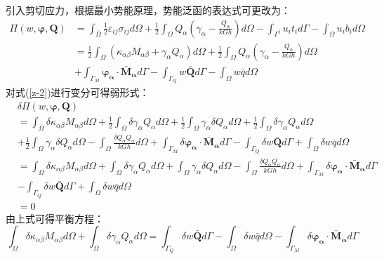 引入剪切应力，根据最小势能原理，势能泛函的表达式可更改为：
\begin{equation}\label{z-2}
\begin{split} 
    \Pi(w,\boldsymbol{\varphi},\boldsymbol{Q})&=\int_{\bar\Omega}\frac{1}{2}\varepsilon_{ij}\sigma_{ij} d\Omega+\frac{1}{2}\int_{\Omega}Q_{\alpha}(\gamma_{\alpha}-\frac{Q_{\alpha}}{kGh})d\Omega-\int_{\Gamma^{t}} u_{i}t_{i}d\Gamma-\int_{\Omega} u_{i}b_{i}d\Omega\\
    &=\frac{1}{2}\int_{\Omega}(\kappa_{\alpha \beta}M_{\alpha \beta}+\gamma_{\alpha}Q_{\alpha})d\Omega+\frac{1}{2}\int_{\Omega}Q_{\alpha}(\gamma_{\alpha}-\frac{Q_{\alpha}}{kGh})d\Omega\\
    &+\int_{\Gamma_{M}}\pmb\varphi_{\pmb \alpha}\cdot{\bar{\pmb M}_{\pmb{\alpha}}}d\Gamma-\int_{\Gamma_{Q}}{w}\bar {\pmb Q}d\Gamma-\int_{\Omega} w\bar{q}d\Omega
\end{split}
\end{equation}
对式(\ref{z-2})进行变分可得弱形式：
\begin{equation} 
    \begin{split}
    &\delta\Pi(w,\boldsymbol\varphi,\boldsymbol{Q})\\
    &=\int_{\Omega}\delta\kappa_{\alpha \beta}M_{\alpha \beta}d\Omega+\frac{1}{2}\int_{\Omega}\delta\gamma_{\alpha}Q_{\alpha}d\Omega+\frac{1}{2}\int_{\Omega}\gamma_{\alpha}\delta{Q}_{\alpha}d\Omega+\frac{1}{2}\int_{\Omega}\delta\gamma_{\alpha}Q_{\alpha}d\Omega\\
    &+\frac{1}{2}\int_{\Omega}\gamma_{\alpha}\delta{Q}_{\alpha}d\Omega-\int_{\Omega}\frac{\delta{Q}_{\alpha}{Q}_{\alpha}}{kGh}d\Omega+\int_{\Gamma_{M}}\delta\pmb\varphi_{\boldsymbol \alpha}\cdot{\boldsymbol{\bar M}_{\boldsymbol{\alpha}}}d\Gamma-\int_{\Gamma_{Q}}\delta{w}\boldsymbol{\bar Q}d\Gamma+\int_{\Omega} \delta{w}\bar{q}d\Omega\\
    &=\int_{\Omega}\delta\kappa_{\alpha \beta}M_{\alpha \beta}d\Omega+\int_{\Omega}\delta\gamma_{\alpha}Q_{\alpha}d\Omega+\int_{\Omega}\gamma_{\alpha}\delta{Q}_{\alpha}d\Omega-\int_{\Omega}\frac{\delta{Q}_{\alpha}{Q}_{\alpha}}{kGh}d\Omega+\int_{\Gamma_{M}}\delta\pmb\varphi_{\boldsymbol \alpha}\cdot{\boldsymbol{\bar M}_{\boldsymbol{\alpha}}}d\Gamma\\
    &-\int_{\Gamma_{Q}}\delta{w}\boldsymbol{\bar Q}d\Gamma+\int_{\Omega} \delta{w}\bar{q}d\Omega\\
    &=0
    \end{split}
\end{equation}
由上式可得平衡方程：
\begin{equation}\label{z-3}
    \int_{\Omega}\delta\kappa_{\alpha \beta}M_{\alpha \beta}d\Omega+\int_{\Omega}\delta\gamma_{\alpha}Q_{\alpha}d\Omega=\int_{\Gamma_{Q}}\delta{w}\pmb{\bar Q}d\Gamma-\int_{\Omega} \delta{w}\bar{q}d\Omega-\int_{\Gamma_{M}}\delta\pmb\varphi_{\pmb \alpha}\cdot{\pmb{\bar M}_{\pmb{\alpha}}}d\Gamma
\end{equation}
